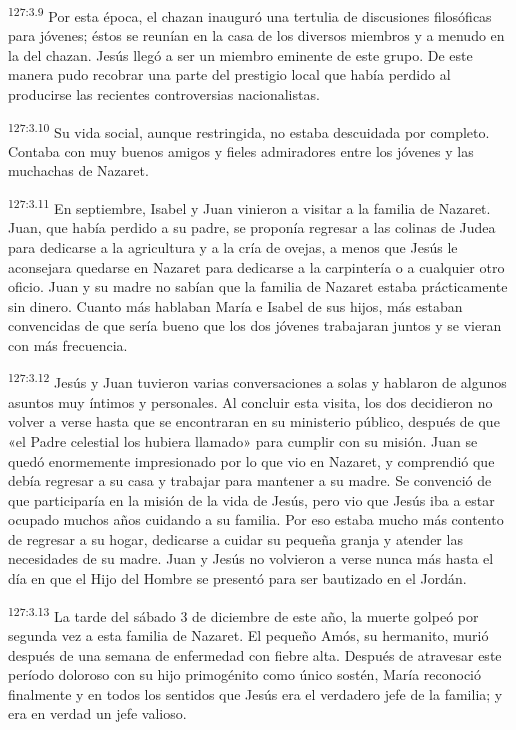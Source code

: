 \par 
\textsuperscript{127:3.9} Por esta época, el chazan inauguró una tertulia de discusiones filosóficas para jóvenes; éstos se reunían en la casa de los diversos miembros y a menudo en la del chazan. Jesús llegó a ser un miembro eminente de este grupo. De este manera pudo recobrar una parte del prestigio local que había perdido al producirse las recientes controversias nacionalistas.

\par 
\textsuperscript{127:3.10} Su vida social, aunque restringida, no estaba descuidada por completo. Contaba con muy buenos amigos y fieles admiradores entre los jóvenes y las muchachas de Nazaret.

\par 
\textsuperscript{127:3.11} En septiembre, Isabel y Juan vinieron a visitar a la familia de Nazaret. Juan, que había perdido a su padre, se proponía regresar a las colinas de Judea para dedicarse a la agricultura y a la cría de ovejas, a menos que Jesús le aconsejara quedarse en Nazaret para dedicarse a la carpintería o a cualquier otro oficio. Juan y su madre no sabían que la familia de Nazaret estaba prácticamente sin dinero. Cuanto más hablaban María e Isabel de sus hijos, más estaban convencidas de que sería bueno que los dos jóvenes trabajaran juntos y se vieran con más frecuencia.

\par 
\textsuperscript{127:3.12} Jesús y Juan tuvieron varias conversaciones a solas y hablaron de algunos asuntos muy íntimos y personales. Al concluir esta visita, los dos decidieron no volver a verse hasta que se encontraran en su ministerio público, después de que «el Padre celestial los hubiera llamado» para cumplir con su misión. Juan se quedó enormemente impresionado por lo que vio en Nazaret, y comprendió que debía regresar a su casa y trabajar para mantener a su madre. Se convenció de que participaría en la misión de la vida de Jesús, pero vio que Jesús iba a estar ocupado muchos años cuidando a su familia. Por eso estaba mucho más contento de regresar a su hogar, dedicarse a cuidar su pequeña granja y atender las necesidades de su madre. Juan y Jesús no volvieron a verse nunca más hasta el día en que el Hijo del Hombre se presentó para ser bautizado en el Jordán.

\par 
\textsuperscript{127:3.13} La tarde del sábado 3 de diciembre de este año, la muerte golpeó por segunda vez a esta familia de Nazaret. El pequeño Amós, su hermanito, murió después de una semana de enfermedad con fiebre alta. Después de atravesar este período doloroso con su hijo primogénito como único sostén, María reconoció finalmente y en todos los sentidos que Jesús era el verdadero jefe de la familia; y era en verdad un jefe valioso.

